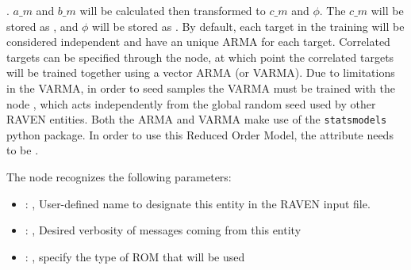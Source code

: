   . \nb $a\_m$ and $b\_m$ will be calculated then transformed to
  $c\_m$ and $\phi$. The $c\_m$ will be stored as , and $\phi$ will be stored as
  .                         By default, each target in the training will be
  considered independent and have an unique ARMA for each                         target.
  Correlated targets can be specified through the  node, at which point
  the correlated targets will be trained together using a vector ARMA (or VARMA). Due to limitations
  in                         the VARMA, in order to seed samples the VARMA must be trained with the
  node , which acts                         independently from the global random seed
  used by other RAVEN entities.                         Both the ARMA and VARMA make use of the
  \texttt{statsmodels} python package.                         In order to use this Reduced Order
  Model, the  attribute                          needs to be
  .

  The  node recognizes the following parameters:
    \begin{itemize}
      \item {}: , 
        User-defined name to designate this entity in the RAVEN input file.
      \item {}: , 
        Desired verbosity of messages coming from this entity
      \item {}: , 
        specify the type of ROM that will be used
  \end{itemize}

